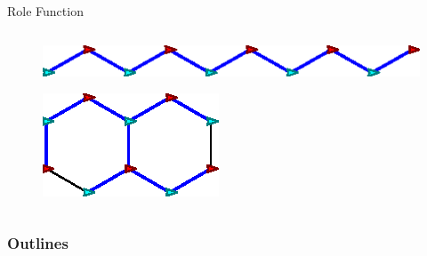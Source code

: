 \begin{frame}{Role Function}
\begin{columns}[T]
\begin{column}{.5\textwidth}
      \begin{figure}
        \centering
        \includegraphics[width=0.75\linewidth]{figs/bad-hexagon}
      \end{figure}
      \begin{figure}
        \centering
        \includegraphics[scale=0.8]{figs/good-hexagon}
        \end{figure}
    \end{column}%
  \end{columns}
\end{frame}

\begin{frame}
  \frametitle{Outlines}
  \tableofcontents[]
\end{frame}

